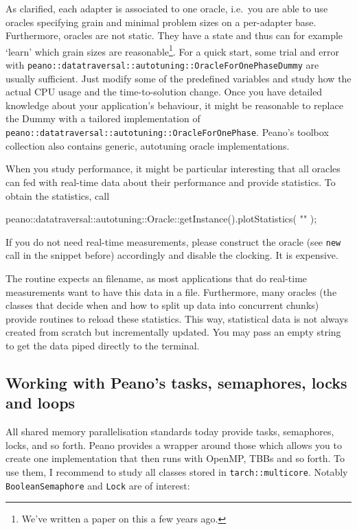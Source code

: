 \noindent
As clarified, each adapter is associated to one oracle, i.e.~you are able to
use oracles specifying grain and minimal problem sizes on a per-adapter base.
Furthermore, oracles are not static.
They have a state and thus can for example `learn' which grain sizes are
reasonable\footnote{We've written a paper on this a few years ago.}.
For a quick start, some trial and error with
\texttt{peano::datatraversal::autotuning::OracleForOnePhaseDummy} are usually
sufficient.
Just modify some of the predefined variables and study how the actual CPU usage
and the time-to-solution change.
Once you have detailed knowledge about your application's behaviour, it might
be reasonable to replace the Dummy with a tailored implementation of
\texttt{peano::datatraversal::autotuning::OracleForOnePhase}.
Peano's toolbox collection also contains generic, autotuning oracle
implementations.


When you study performance, it might be particular interesting that all oracles
can fed with real-time data about their performance and provide statistics. To
obtain the statistics, call
\begin{code}
  peano::datatraversal::autotuning::Oracle::getInstance().plotStatistics( "" );
\end{code}


\noindent
If you do not need real-time measurements, please construct the oracle (see
\texttt{new} call in the snippet before) accordingly and disable the clocking.
It is expensive.

The routine expects an filename, as most applications that do real-time
measurements want to have this data in a file. 
Furthermore, many oracles (the classes that decide when and how to split up
data into concurrent chunks) provide routines to reload these statistics.
This way, statistical data is not always created from scratch but incrementally
updated.
You may pass an empty string to get the data piped directly to the terminal.


\subsection{Working with Peano's tasks, semaphores, locks and loops}

All shared memory parallelisation standards today provide tasks, semaphores,
locks, and so forth.
Peano provides a wrapper around those which allows you to create one
implementation that then runs with OpenMP, TBBs and so forth.
To use them, I recommend to study all classes stored in
\texttt{tarch::multicore}.
Notably \texttt{BooleanSemaphore} and \texttt{Lock} are of interest:

